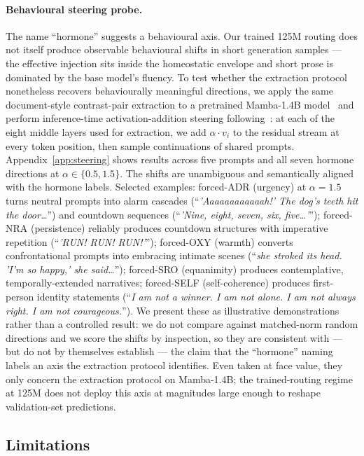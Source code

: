 \paragraph{Behavioural steering probe.} The name ``hormone'' suggests a behavioural axis. Our trained 125M routing does not itself produce observable behavioural shifts in short generation samples --- the effective injection sits inside the homeostatic envelope and short prose is dominated by the base model's fluency. To test whether the extraction protocol nonetheless recovers behaviourally meaningful directions, we apply the same document-style contrast-pair extraction to a pretrained Mamba-1.4B model~\citep{gu2023mamba} and perform inference-time activation-addition steering following~\citet{turner2023activation, rimsky2024steering}: at each of the eight middle layers used for extraction, we add $\alpha \cdot v_i$ to the residual stream at every token position, then sample continuations of shared prompts. Appendix~\ref{app:steering} shows results across five prompts and all seven hormone directions at $\alpha \in \{0.5, 1.5\}$. The shifts are unambiguous and semantically aligned with the hormone labels. Selected examples: forced-ADR (urgency) at $\alpha = 1.5$ turns neutral prompts into alarm cascades (``\emph{'Aaaaaaaaaaaah!' The dog's teeth hit the door\ldots}'') and countdown sequences (``\emph{'Nine, eight, seven, six, five\ldots'}''); forced-NRA (persistence) reliably produces countdown structures with imperative repetition (``\emph{'RUN! RUN! RUN!'}''); forced-OXY (warmth) converts confrontational prompts into embracing intimate scenes (``\emph{she stroked its head. 'I'm so happy,' she said\ldots}''); forced-SRO (equanimity) produces contemplative, temporally-extended narratives; forced-SELF (self-coherence) produces first-person identity statements (``\emph{I am not a winner. I am not alone. I am not always right. I am not courageous.}''). We present these as illustrative demonstrations rather than a controlled result: we do not compare against matched-norm random directions and we score the shifts by inspection, so they are consistent with --- but do not by themselves establish --- the claim that the ``hormone'' naming labels an axis the extraction protocol identifies. Even taken at face value, they only concern the extraction protocol on Mamba-1.4B; the trained-routing regime at 125M does not deploy this axis at magnitudes large enough to reshape validation-set predictions.

\subsection{Limitations}

